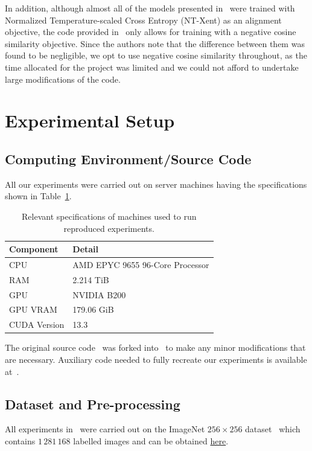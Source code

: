 \documentclass{article}
\begin{document}
In addition, although almost all of the models presented in~\cite{yu2025repa} were trained with Normalized Temperature-scaled Cross Entropy (NT-Xent) as an alignment objective, the code provided in~\cite{reparepo} only allows for training with a negative cosine similarity objective. Since the authors note that the difference between them was found to be negligible, we opt to use negative cosine similarity throughout, as the time allocated for the project was limited and we could not afford to undertake large modifications of the code. 

\section{Experimental Setup}\label{sec:experiments}

\subsection{Computing Environment/Source Code}

All our experiments were carried out on server machines having the specifications shown in Table~\ref{tab:machine-specs}.

\begin{table}
    \centering
    \begin{tabular}{l|l}
        Component & Detail \\
        \hline
        CPU & AMD EPYC 9655 96-Core Processor \\
        RAM & 2.214 TiB \\
        GPU & NVIDIA B200 \\
        GPU VRAM & 179.06 GiB \\
        CUDA Version & 13.3
    \end{tabular}
    \caption{Relevant specifications of machines used to run reproduced experiments.}\label{tab:machine-specs}
\end{table}

The original source code~\cite{reparepo} was forked into~\cite{reparepofork} to make any minor modifications that are necessary. Auxiliary code needed to fully recreate our experiments is available at~\cite{mainrepo}.

\subsection{Dataset and Pre-processing}

All experiments in~\cite{yu2025repa} were carried out on the ImageNet $256\times 256$ dataset~\cite{imagenet} which contains $1\,281\,168$ labelled images and can be obtained \href{https://www.kaggle.com/competitions/imagenet-object-localization-challenge/}{here}. 
\end{document}
